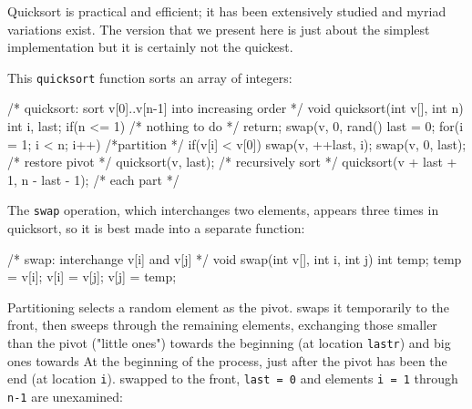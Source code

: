 Quicksort is practical and efficient; it has been extensively studied and
myriad variations exist. The version that we present here is just about the
simplest implementation but it is certainly not the quickest.

This \verb'quicksort' function sorts an array of integers:
\begin{wellcode}
    /* quicksort: sort v[0]..v[n-1] into increasing order */
    void quicksort(int v[], int n)
    {
        int i, last;
        if(n <= 1) /* nothing to do */
        {
            return;
        }
        swap(v, 0, rand() %
        last = 0;
        for(i = 1; i < n; i++)  /*partition */
        {
            if(v[i] < v[0])
            {
                swap(v, ++last, i);
            }
            swap(v, 0, last);   /* restore pivot */
            quicksort(v, last); /* recursively sort */
            quicksort(v + last + 1, n - last - 1); /* each part */
        }
    }
\end{wellcode}

The \verb'swap' operation, which interchanges two elements, appears three
times in quicksort, so it is best made into a separate function:
\begin{wellcode}
    /* swap: interchange v[i] and v[j] */
    void swap(int v[], int i, int j)
    {
        int temp;
        temp = v[i];
        v[i] = v[j];
        v[j] = temp;
    }
\end{wellcode}

Partitioning selects a random element as the pivot. swaps it temporarily to
the front, then sweeps through the remaining elements, exchanging those
smaller than the pivot ("little ones") towards the beginning (at location
\verb'lastr') and big ones towards At the beginning of the process, just
after the pivot has been the end (at location \verb'i').  swapped to the
front, \verb'last = 0' and elements \verb'i = 1' through \verb'n-1' are
unexamined:
\begin{figure}[h]
    \centering
{}
\end{figure}

